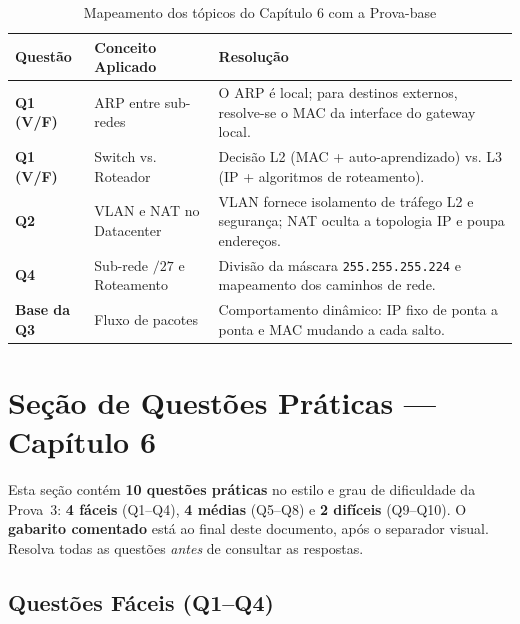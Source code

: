 \documentclass[11pt,a4paper]{article}
\begin{document}
\begin{table}[h!]
\centering
\caption{Mapeamento dos tópicos do Capítulo 6 com a Prova-base}
\label{tab:relacao_prova_cap6}
\begin{tabularx}{\textwidth}{lXX}
\toprule
\textbf{Questão} & \textbf{Conceito Aplicado} & \textbf{Resolução} \\
\midrule
\textbf{Q1 (V/F)} & ARP entre sub-redes & O ARP é local; para destinos externos, resolve-se o MAC da interface do gateway local. \\
\textbf{Q1 (V/F)} & Switch vs. Roteador & Decisão L2 (MAC + auto-aprendizado) vs. L3 (IP + algoritmos de roteamento). \\
\textbf{Q2} & VLAN e NAT no Datacenter & VLAN fornece isolamento de tráfego L2 e segurança; NAT oculta a topologia IP e poupa endereços. \\
\textbf{Q4} & Sub-rede $/27$ e Roteamento & Divisão da máscara \texttt{255.255.255.224} e mapeamento dos caminhos de rede. \\
\textbf{Base da Q3} & Fluxo de pacotes & Comportamento dinâmico: IP fixo de ponta a ponta e MAC mudando a cada salto. \\
\bottomrule
\end{tabularx}
\end{table}


\clearpage
\hrulefill

\section*{Seção de Questões Práticas --- Capítulo 6}

\begin{nota}
Esta seção contém \textbf{10 questões práticas} no estilo e grau de dificuldade da Prova~3: \textbf{4 fáceis} (Q1--Q4), \textbf{4 médias} (Q5--Q8) e \textbf{2 difíceis} (Q9--Q10). O \textbf{gabarito comentado} está ao final deste documento, após o separador visual. Resolva todas as questões \emph{antes} de consultar as respostas.
\end{nota}

\subsection*{Questões Fáceis (Q1--Q4)}
\end{document}
